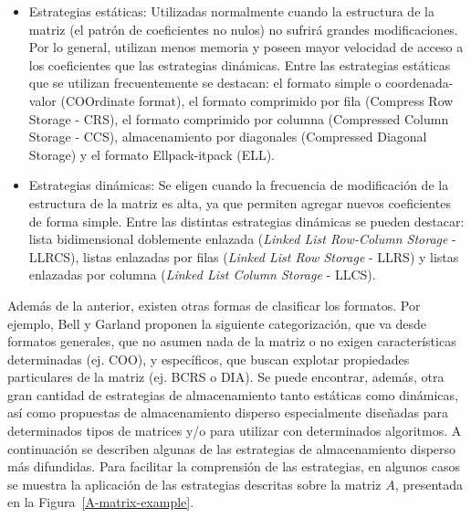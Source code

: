 \begin{itemize}
    \item Estrategias estáticas: Utilizadas normalmente cuando la estructura de
la matriz (el patrón de coeficientes no nulos) no sufrirá grandes modificaciones. Por lo general, utilizan menos memoria y poseen mayor velocidad de acceso a los coeficientes que las estrategias dinámicas. Entre las estrategias estáticas que se utilizan frecuentemente se destacan: el formato simple o coordenada-valor (COOrdinate format), el formato comprimido por fila (Compress Row Storage - CRS), el formato comprimido por columna (Compressed Column Storage - CCS), almacenamiento por diagonales (Compressed Diagonal Storage) y el formato Ellpack-itpack (ELL).
    \item Estrategias dinámicas: Se eligen cuando la frecuencia de modificación de la
estructura de la matriz es alta, ya que permiten agregar nuevos coeficientes de forma simple. Entre las distintas estrategias dinámicas se pueden destacar: lista bidimensional doblemente enlazada (\textit{Linked List Row-Column
Storage} - LLRCS), listas enlazadas por filas (\textit{Linked List Row Storage} - LLRS) y listas enlazadas por columna (\textit{Linked List Column Storage} - LLCS).
\end{itemize}

Además de la anterior, existen otras formas de clasificar los formatos. Por ejemplo, Bell y Garland \cite{Bell2009, bell-course} proponen la siguiente categorización, que va desde formatos generales, que no asumen nada de la matriz o no exigen características determinadas (ej. COO), y específicos, que buscan explotar propiedades particulares de la matriz (ej. BCRS o DIA). Se puede encontrar, además, otra gran cantidad de estrategias de almacenamiento tanto estáticas como dinámicas, así como propuestas de almacenamiento disperso especialmente diseñadas para determinados tipos de matrices y/o para utilizar con determinados algoritmos.
A continuación se describen algunas de las estrategias de almacenamiento disperso más difundidas. Para facilitar la comprensión de las estrategias, en algunos casos se muestra la aplicación de las estrategias descritas sobre la matriz $A$, presentada en la Figura~\ref{A-matrix-example}.




